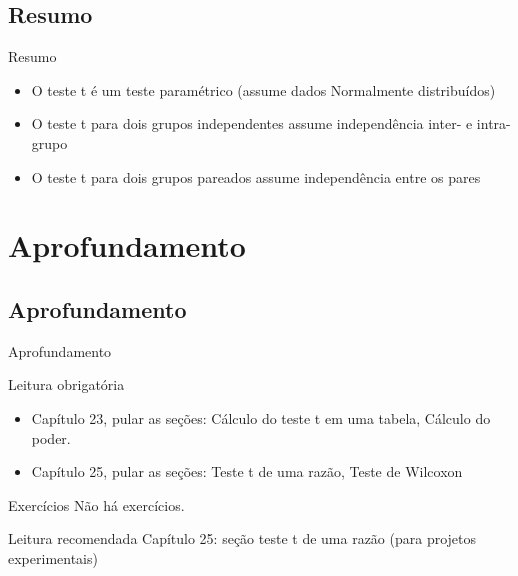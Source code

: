 \documentclass{beamer}
\begin{document}

\subsection{Resumo}

\begin{frame}{Resumo}
  \begin{itemize}
  \item O teste t é um teste paramétrico (assume dados Normalmente distribuídos)
  \item O teste t para dois grupos independentes assume independência inter- e intra-grupo
  \item O teste t para dois grupos pareados assume independência entre os pares
  \end{itemize}
\end{frame}

\section{Aprofundamento}

\subsection{Aprofundamento}

\begin{frame}{Aprofundamento}
  \begin{block}{Leitura obrigatória}
    \begin{itemize}
    \item Capítulo 23, pular as seções: Cálculo do teste t em uma tabela, Cálculo do poder.
    \item Capítulo 25, pular as seções: Teste t de uma razão, Teste de Wilcoxon
    \end{itemize}
  \end{block}
  \begin{block}{Exercícios}
    Não há exercícios.
  \end{block}
  \begin{block}{Leitura recomendada}
    Capítulo 25: seção teste t de uma razão (para projetos experimentais)
  \end{block}
\end{frame}
\end{document}

